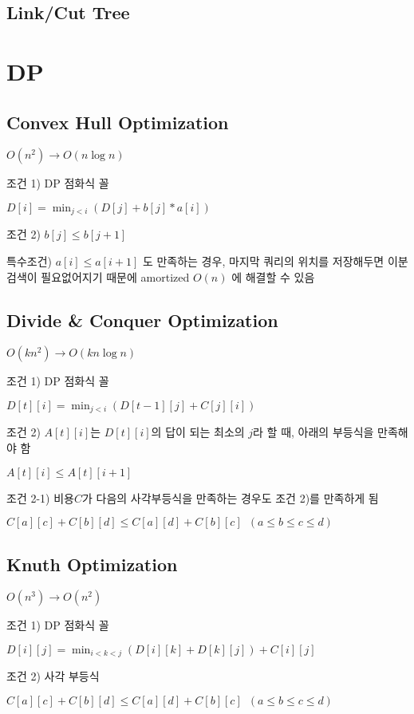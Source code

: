 \documentclass[10pt,landscape,a4paper,twocolumn]{article}
\begin{document}
\subsection{Link/Cut Tree}


\section{DP}

\subsection{Convex Hull Optimization}

$O(n^{2}) \to O(n\log{n})$

조건 1) DP 점화식 꼴

$D[i] = \min_{j<i}( D[j] + b[j] * a[i] )$

조건 2) $b[j] \leq b[j+1]$

특수조건) $a[i] \leq a[i+1]$ 도 만족하는 경우, 마지막 쿼리의 위치를 저장해두면 이분검색이 필요없어지기 때문에 amortized $O(n)$ 에 해결할 수 있음

\subsection{Divide \& Conquer Optimization}

$O(kn^{2}) \to O(kn\log{n})$

조건 1) DP 점화식 꼴

$D[t][i] = \min_{j<i}( D[t-1][j] + C[j][i] )$

조건 2) $A[t][i]$는 $D[t][i]$의 답이 되는 최소의 $j$라 할 때, 아래의 부등식을 만족해야 함

$A[t][i] \leq A[t][i+1]$

조건 2-1) 비용$C$가 다음의 사각부등식을 만족하는 경우도 조건 2)를 만족하게 됨

$C[a][c] + C[b][d] \leq C[a][d] + C[b][c] \phantom{1} (a \leq b \leq c \leq d)$

\subsection{Knuth Optimization}

$O(n^{3}) \to O(n^{2})$

조건 1) DP 점화식 꼴

$D[i][j] = \min_{i<k<j}( D[i][k] + D[k][j] ) + C[i][j]$

조건 2) 사각 부등식

$C[a][c] + C[b][d] \leq C[a][d] + C[b][c] \phantom{1} (a \leq b \leq c \leq d)$
\end{document}
